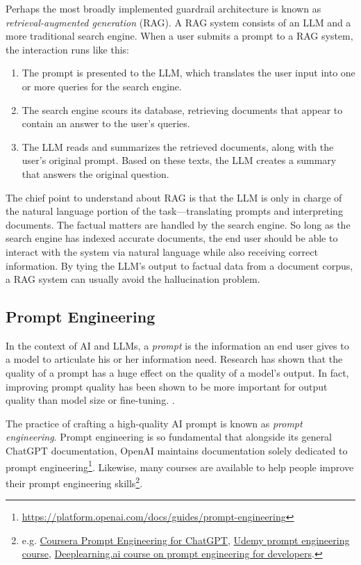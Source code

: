 \documentclass[12pt, oneside]{article}   	%
\begin{document}
Perhaps the most broadly implemented guardrail architecture is known as \emph{retrieval-augmented generation} (RAG).  A RAG system consists of an LLM and a more traditional search engine.  When a user submits a prompt to a RAG system, the interaction runs like this:
\begin{enumerate}
\item The prompt is presented to the LLM, which translates the user input into one or more queries for the search engine.
\item The search engine scours its database, retrieving documents that appear to contain an answer to the user's queries.
\item The LLM reads and summarizes the retrieved documents, along with the user's original prompt.  Based on these texts, the LLM creates a summary that answers the original question.
\end{enumerate}
The chief point to understand about RAG is that the LLM is only in charge of the natural language portion of the task---translating prompts and interpreting documents.  The factual matters are handled by the search engine.  So long as the search engine has indexed accurate documents, the end user should be able to interact with the system via natural language while also receiving correct information.  By tying the LLM's output to factual data from a document corpus, a RAG system can usually avoid the hallucination problem.




\subsection{Prompt Engineering}\label{section.vocab.prompt-engineering}
In the context of AI and LLMs, a \emph{prompt} is the information an end user gives to a model to articulate his or her information need.  Research has shown that the quality of a prompt has a huge effect on the quality of a model's output.  In fact, improving prompt quality has been shown to be more important for output quality than model size or fine-tuning. \cite{white:2023}.  

The practice of crafting a high-quality AI prompt is known as \emph{prompt engineering}.  Prompt engineering is so fundamental that alongside its general ChatGPT documentation, OpenAI maintains documentation solely dedicated to prompt engineering\footnote{\href{https://platform.openai.com/docs/guides/prompt-engineering}{https://platform.openai.com/docs/guides/prompt-engineering}}.  Likewise, many courses are available to help people improve their prompt engineering skills\footnote{e.g. \href{https://www.coursera.org/learn/prompt-engineering}{Coursera Prompt Engineering for ChatGPT}, \href{https://www.udemy.com/course/prompt-engineering-for-ai}{Udemy prompt engineering course}, \href{https://www.deeplearning.ai/short-courses/chatgpt-prompt-engineering-for-developers/}{Deeplearning.ai course on prompt engineering for developers}. }.
\end{document}
